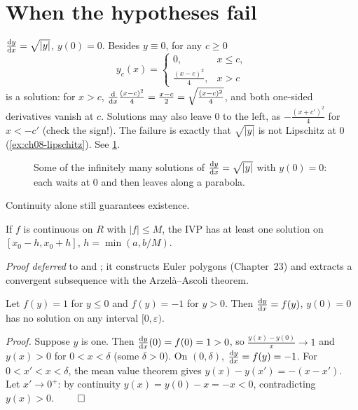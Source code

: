 \section{When the hypotheses fail}\label{sec:ch08-failure}

\begin{example}\label{ex:ch08-sqrt}
$\frac{\mathrm{d}y}{\mathrm{d}x} = \sqrt{|y|}$, $y(0) = 0$. Besides $y\equiv0$, for any $c\ge0$
\[
  y_c(x) = \begin{cases}0, & x\le c,\\ \frac{(x - c)^2}{4}, & x>c\end{cases}
\]
is a solution: for $x>c$, $\frac{\mathrm{d}}{\mathrm{d}x}\frac{(x-c)^2}{4} = \frac{x - c}{2} = \sqrt{\frac{(x-c)^2}{4}}$,
and both one-sided derivatives vanish at $c$. Solutions may also leave $0$ to
the left, as $-\frac{(x + c')^2}{4}$ for $x<-c'$ (check the sign!). The
failure is exactly that $\sqrt{|y|}$ is not Lipschitz at $0$
(\cref{ex:ch08-lipschitz}). See \cref{fig:ch08-sqrt}.
\end{example}

\begin{figure}[ht]
  \centering
  
  \caption{Some of the infinitely many solutions of $\frac{\mathrm{d}y}{\mathrm{d}x} = \sqrt{|y|}$
  with $y(0) = 0$: each waits at $0$ and then leaves along a parabola.}
  \label{fig:ch08-sqrt}
\end{figure}

Continuity alone still guarantees existence.

\begin{theorem}[Peano]\label{thm:ch08-peano}
If $f$ is continuous on $R$ with $|f|\le M$, the IVP has at least one solution
on $[x_0 - h, x_0 + h]$, $h = \min(a, b/M)$.
\end{theorem}
\noindent\emph{Proof deferred} to \textcite[Ch.~1]{CoddingtonLevinson} and
\textcite[\S2.7]{Teschl}; it constructs Euler polygons (Chapter~23) and
extracts a convergent subsequence with the Arzel\`a--Ascoli theorem.

\begin{example}\label{ex:ch08-no-solution}
Let $f(y) = 1$ for $y\le0$ and $f(y) = -1$ for $y>0$. Then
$\frac{\mathrm{d}y}{\mathrm{d}x} = f(y)$, $y(0) = 0$ has no solution on any interval $[0,\varepsilon)$.

\emph{Proof.} Suppose $y$ is one. Then $\frac{\mathrm{d}y}{\mathrm{d}x}(0) = f(0) = 1>0$, so
$\frac{y(x) - y(0)}{x}\to 1$ and $y(x)>0$ for $0<x<\delta$ (some $\delta>0$).
On $(0,\delta)$, $\frac{\mathrm{d}y}{\mathrm{d}x} = f(y) = -1$. For $0<x'<x<\delta$, the mean value theorem
gives $y(x) - y(x') = -(x - x')$. Let $x'\to0^+$: by continuity
$y(x) = y(0) - x = -x<0$, contradicting $y(x)>0$. $\qed$
\end{example}

